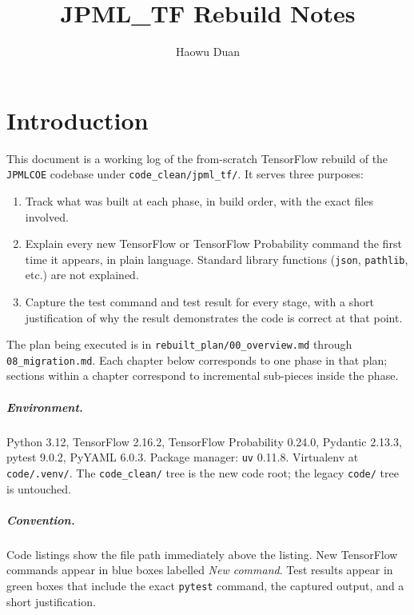 \documentclass[11pt]{report}
\title{JPML\_TF Rebuild Notes}
\author{Haowu Duan}
\date{}
\begin{document}
\maketitle
\tableofcontents

\chapter{Introduction}

This document is a working log of the from-scratch TensorFlow rebuild of
the \texttt{JPMLCOE} codebase under \texttt{code\_clean/jpml\_tf/}. It
serves three purposes:

\begin{enumerate}
  \item Track what was built at each phase, in build order, with the
    exact files involved.
  \item Explain every new TensorFlow or TensorFlow Probability command
    the first time it appears, in plain language. Standard library
    functions (\texttt{json}, \texttt{pathlib}, etc.) are not explained.
  \item Capture the test command and test result for every stage, with
    a short justification of why the result demonstrates the code is
    correct at that point.
\end{enumerate}

The plan being executed is in
\texttt{rebuilt\_plan/00\_overview.md} through
\texttt{08\_migration.md}. Each chapter below corresponds to one phase
in that plan; sections within a chapter correspond to incremental
sub-pieces inside the phase.

\paragraph{Environment.} Python 3.12, TensorFlow 2.16.2,
TensorFlow Probability 0.24.0, Pydantic 2.13.3, pytest 9.0.2,
PyYAML 6.0.3. Package manager: \texttt{uv} 0.11.8. Virtualenv at
\texttt{code/.venv/}. The \texttt{code\_clean/} tree is the new code
root; the legacy \texttt{code/} tree is untouched.

\paragraph{Convention.} Code listings show the file path immediately
above the listing. New TensorFlow commands appear in blue boxes labelled
\textit{New command}. Test results appear in green boxes that include
the exact \texttt{pytest} command, the captured output, and a short
justification.
\end{document}
